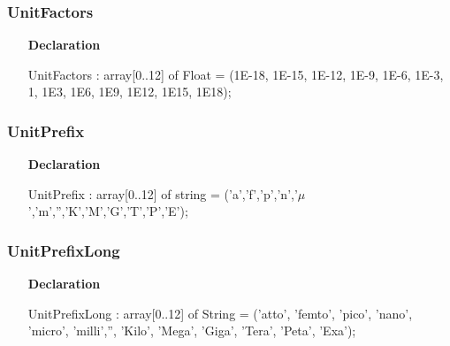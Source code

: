 \documentclass[12pt,a4paper,oneside]{report}
\newcommand{\declarationitem}[1]{\textbf{#1}}
\begin{document}
\subsubsection{UnitFactors}
\label{lmunitsformat-UnitFactors}
\begin{itemize}\item[\declarationitem{Declaration}\hfill]
	\begin{flushleft}
		\begin{ttfamily}
			UnitFactors : array[0..12] of Float = (1E-18, 1E-15, 1E-12, 1E-9, 1E-6, 1E-3, 1, 1E3, 1E6, 1E9, 1E12, 1E15, 1E18);\end{ttfamily}
		
	\end{flushleft}
	
\end{itemize}
\subsubsection{UnitPrefix}
\label{lmunitsformat-UnitPrefix}
\begin{itemize}\item[\declarationitem{Declaration}\hfill]
	\begin{flushleft}
		\begin{ttfamily}
			UnitPrefix  : array[0..12] of string = ('a','f','p','n','$\mu$','m','','K','M','G','T','P','E');\end{ttfamily}
		
	\end{flushleft}
	
\end{itemize}
\subsubsection{UnitPrefixLong}
\label{lmunitsformat-UnitPrefixLong}
\begin{itemize}\item[\declarationitem{Declaration}\hfill]
	\begin{flushleft}
		\begin{ttfamily}
			UnitPrefixLong : array[0..12] of String =
			('atto', 'femto', 'pico', 'nano', 'micro', 'milli','', 'Kilo', 'Mega', 'Giga', 'Tera', 'Peta', 'Exa');\end{ttfamily}
		
	\end{flushleft}
	
\end{itemize}
\end{document}
